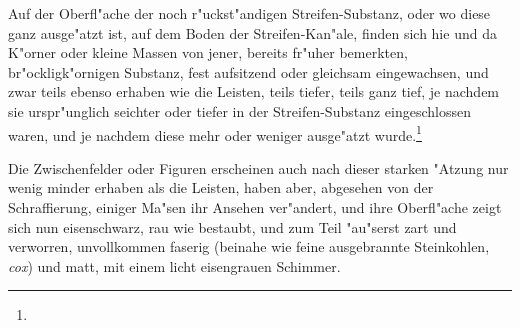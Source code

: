 \documentclass[a4paper, 11pt, oneside, german]{article}
\begin{document}
Auf der Oberfl"ache der noch r"uckst"andigen Streifen-Substanz, oder wo diese ganz ausge"atzt ist, auf dem Boden der Streifen-Kan"ale, finden sich hie und da K"orner oder kleine Massen von jener, bereits fr"uher bemerkten, br"ockligk"ornigen Substanz, fest aufsitzend oder gleichsam eingewachsen, und zwar teils ebenso erhaben wie die Leisten, teils tiefer, teils ganz tief, je nachdem sie urspr"unglich seichter oder tiefer in der Streifen-Substanz eingeschlossen waren, und je nachdem diese mehr oder weniger ausge"atzt wurde.\footnote{}

Die Zwischenfelder oder Figuren erscheinen auch nach dieser starken "Atzung nur wenig minder erhaben als die Leisten, haben aber, abgesehen von der Schraffierung, einiger Ma"sen ihr Ansehen ver"andert, und ihre Oberfl"ache zeigt sich nun eisenschwarz, rau wie bestaubt, und zum Teil "au"serst zart und verworren, unvollkommen faserig (beinahe wie feine ausgebrannte Steinkohlen, \emph{cox}) und matt, mit einem licht eisengrauen Schimmer.
\end{document}
